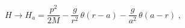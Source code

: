 \begin{equation}
H \rightarrow
H_{a}= \frac{ p^{2}}{2M}  
- 
\frac{g}{r^{2}} \,  \theta (r-a)
- 
\frac{g}{a^{2}}  \, \theta (a-r)
\; ,
\label{eq:2D_ISP_Hamiltonian_regularized}
\end{equation}

